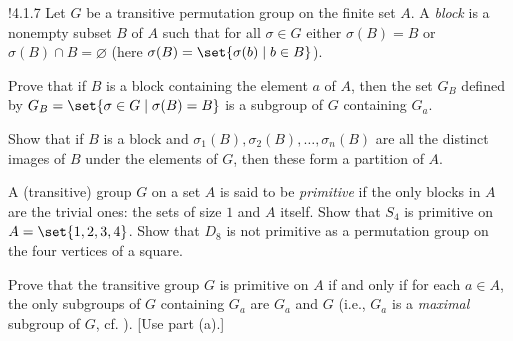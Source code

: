 \begin{exercise}!{4.1.7}
	Let $G$ be a transitive permutation group on the finite set $A$.
	A \emph{block} is a nonempty subset $B$ of $A$ such that for all $\sigma \in G$ either $\sigma(B) = B$ or $\sigma(B) \cap B = \varnothing$ (here $\sigma(B) = \set{\sigma(b) \mid b \in B}$). 
	\begin{subexercises}
		\item Prove that if $B$ is a block containing the element $a$ of $A$, then the set $G_B$ defined by $G_B = \set{\sigma \in G \mid \sigma(B) = B}$ is a subgroup of $G$ containing $G_a$.
		\item Show that if $B$ is a block and $\sigma_1(B), \sigma_2(B), \ldots, \sigma_n(B)$ are all the distinct images of $B$ under the elements of $G$, then these form a partition of $A$.
		\item A (transitive) group $G$ on a set $A$ is said to be \emph{primitive} if the only blocks in $A$ are the trivial ones: the sets of size $1$ and $A$ itself.
		Show that $S_4$ is primitive on $A = \set{1,2,3,4}$.
		Show that $D_8$ is not primitive as a permutation group on the four vertices of a square.
		\item Prove that the transitive group $G$ is primitive on $A$ if and only if for each $a \in A$, the only subgroups of $G$ containing $G_a$ are $G_a$ and $G$ (i.e., $G_a$ is a \emph{maximal} subgroup of $G$, cf. ). [Use part (a).]
	\end{subexercises}
\end{exercise}

